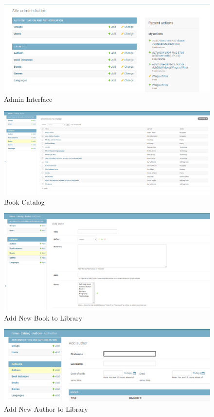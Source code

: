 \documentclass[12pt, a4paper]{report}
\begin{document}
\newpage
\begin{figure}[htb]
	\centering
	\includegraphics[scale=0.6]{./admin-interface} 
	\caption{Admin Interface}
	\label{fig:admin} 
\end{figure}

\newpage
\begin{figure}[htb]
	\centering
	\includegraphics[scale=0.3]{./book-catalog} 
	\caption{Book Catalog}
	\label{fig:catalog} 
\end{figure}

\newpage
\begin{figure}[htb]
	\centering
	\includegraphics[scale=0.4]{./add-book} 
	\caption{Add New Book to Library}
	\label{fig:bookadd} 
\end{figure}

\newpage
\begin{figure}[htb]
	\centering
	\includegraphics[scale=0.5]{./author-add} 
	\caption{Add New Author to Library}
	\label{fig:author-add} 
\end{figure}
\end{document}
